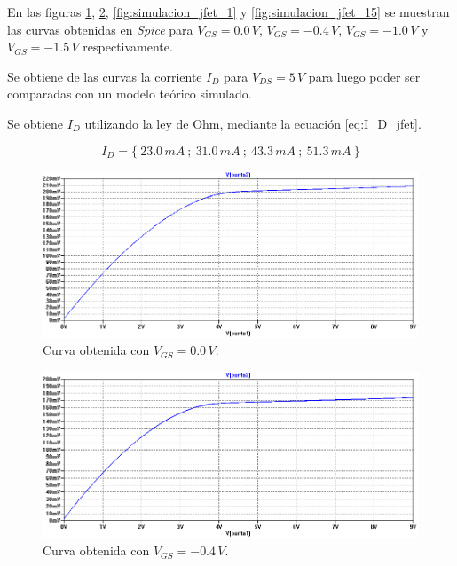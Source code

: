 \documentclass[10pt,spanish,a4paper,notitlepage]{article}
\begin{document}
En las figuras \ref{fig:simulacion_jfet_0}, \ref{fig:simulacion_jfet_04},
\ref{fig:simulacion_jfet_1} y \ref{fig:simulacion_jfet_15} se muestran las curvas
obtenidas en \emph{Spice} para $V_{GS} = 0.0\,\unit{V}$, $V_{GS} = -0.4\,\unit{V}$,
$V_{GS} = -1.0\,\unit{V}$ y $V_{GS} = -1.5\,\unit{V}$ respectivamente.

Se obtiene de las curvas la corriente $I_D$ para $V_{DS} = 5\,\unit{V}$ para luego
poder ser comparadas con un modelo teórico simulado.

Se obtiene $I_D$ utilizando la ley de Ohm, mediante la ecuación \ref{eq:I_D_jfet}.

\[ \displaystyle I_D = \{\ 23.0\,\unit{mA} \ ;\ 31.0\,\unit{mA} \ ;\ 43.3\,\unit{mA} \ ;\ 51.3\,\unit{mA} \ \} \]

\begin{figure}[H]
\centering
\includegraphics[scale=0.6]{simulaciones/2_vgs0_sim.png}
\caption{Curva obtenida con $V_{GS} = 0.0\,\unit{V}$.}
\label{fig:simulacion_jfet_0}
\end{figure}

\begin{figure}[H]
\centering
\includegraphics[scale=0.6]{simulaciones/2_vgs-04_sim.png}
\caption{Curva obtenida con $V_{GS} = -0.4\,\unit{V}$.}
\label{fig:simulacion_jfet_04}
\end{figure}
\end{document}
